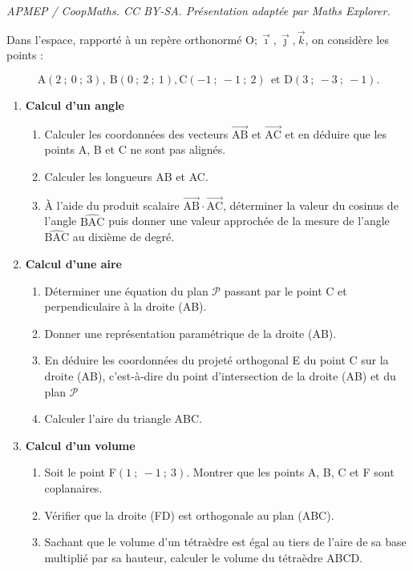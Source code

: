 \documentclass[10pt]{article}
\providecommand{\vect}[1]{\overrightarrow{#1}}
\providecommand{\Oijk}{\(\mathrm{O};\vec{\imath},\vec{\jmath},\vec{k}\)}
\begin{document}
\noindent\textit{APMEP / CoopMaths. CC BY-SA. Présentation adaptée par Maths Explorer.}\par\medskip
\medskip

Dans l'espace, rapporté à un repère orthonormé \Oijk, on considère les points : 

\[\text{A}(2~;~0~;~3),\: \text{B}(0~;~2~;~1), \text{C}(-1~;~-1~;~2)\:\: \text{et D}(3~;~-3~;~ -1).\]
\smallskip

\begin{enumerate}
\item \textbf{Calcul d'un angle}
	\begin{enumerate}
		\item Calculer les coordonnées des vecteurs $\vect{\text{AB}}$ et $\vect{\text{AC}}$ et en déduire que les points A, B et C ne sont pas alignés.
		\item Calculer les longueurs AB et AC.
		\item À l'aide du produit scalaire $\vect{\text{AB}}\cdot \vect{\text{AC}}$, déterminer la valeur du cosinus de l'angle
$\widehat{\text{BAC}}$ puis donner une valeur approchée de la mesure de l'angle $\widehat{\text{BAC}}$ au dixième de degré.
	\end{enumerate}
\item \textbf{Calcul d'une aire}
	\begin{enumerate}
		\item Déterminer une équation du plan $\mathcal{P}$ passant par le point C et perpendiculaire à la droite (AB).
		\item Donner une représentation paramétrique de la droite (AB).
		\item En déduire les coordonnées du projeté orthogonal E du point C sur la droite
(AB), c'est-à-dire du point d'intersection de la droite (AB) et du plan $\mathcal{P}$
		\item Calculer l'aire du triangle ABC.
	\end{enumerate}
\item \textbf{Calcul d'un volume}
	\begin{enumerate}
		\item Soit le point F$(1~;~-1~;~3)$. Montrer que les points A, B, C et F sont coplanaires.
		\item Vérifier que la droite (FD) est orthogonale au plan (ABC).
		\item Sachant que le volume d'un tétraèdre est égal au tiers de l'aire de sa base
multiplié par sa hauteur, calculer le volume du tétraèdre ABCD.
	\end{enumerate}
\end{enumerate}

\bigskip
\end{document}
